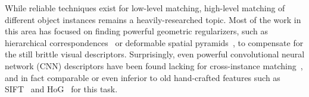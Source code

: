 \documentclass[10pt,twocolumn,letterpaper]{article}
\begin{document}
While reliable techniques exist for low-level matching, high-level matching of different object instances remains a heavily-researched topic. Most of the work in this area has focused on finding powerful geometric regularizers, such as hierarchical correspondences~\cite{liu08siftflow} or deformable spatial pyramids~\cite{kim2013deformable}, to compensate for the still brittle visual descriptors. Surprisingly, even powerful convolutional neural network (CNN) descriptors have been found lacking for cross-instance matching~\cite{long2014do,ham2016,zhou2016learning}, and in fact comparable or even inferior to old hand-crafted features such as SIFT~\cite{lowe2004sift} and HoG~\cite{dalal05hog} for this task.

\begin{figure*}[t!]
	\newcommand{\filterimH}{4.05em}
	\newcommand{\agfilterW}{0.95\columnwidth}
 \scriptsize
  \begin{center}


\end{center}
\end{figure*}
\end{document}
